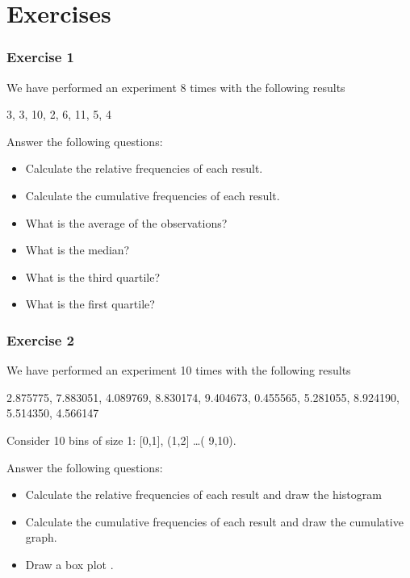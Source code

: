 \documentclass[
]{book}
\providecommand{\tightlist}{%
  \setlength{\itemsep}{0pt}\setlength{\parskip}{0pt}}
\begin{document}
\hypertarget{exercises}{%
\section{Exercises}\label{exercises}}

\hypertarget{exercise-1}{%
\subsubsection{Exercise 1}\label{exercise-1}}

We have performed an experiment 8 times with the following results

3, 3, 10, 2, 6, 11, 5, 4

Answer the following questions:

\begin{itemize}
\tightlist
\item
  Calculate the relative frequencies of each result.
\item
  Calculate the cumulative frequencies of each result.
\item
  What is the average of the observations?
\item
  What is the median?
\item
  What is the third quartile?
\item
  What is the first quartile?
\end{itemize}

\hypertarget{exercise-2}{%
\subsubsection{Exercise 2}\label{exercise-2}}

We have performed an experiment 10 times with the following results

2.875775, 7.883051, 4.089769, 8.830174, 9.404673, 0.455565, 5.281055, 8.924190, 5.514350, 4.566147

Consider 10 bins of size 1: {[}0,1{]}, (1,2{]} \ldots( 9,10).

Answer the following questions:

\begin{itemize}
\item
  Calculate the relative frequencies of each result and draw the histogram
\item
  Calculate the cumulative frequencies of each result and draw the cumulative graph.
\item
  Draw a box plot .
\end{itemize}
\end{document}
